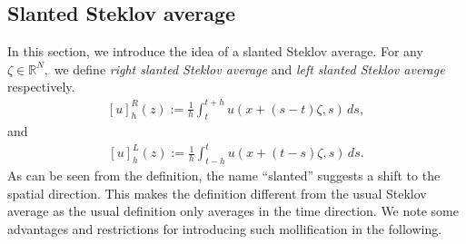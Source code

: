 \documentclass[10pt,a4paper]{amsart}
\numberwithin{equation}{section}
\newcommand{\RR}{\mathds{R}}
\begin{document}
\subsection{Slanted Steklov average}\label{subsec:slanting}
In this section, we introduce the idea of a slanted Steklov average. For any $\zeta \in \RR^N,$ we define \textit{right slanted Steklov average} and \textit{left slanted Steklov average} respectively. 
\begin{align}\label{right slanted steklov}
[u]_{h}^{R}(z):=\frac{1}{h}\int_{t}^{t+h}u(x+(s-t)\zeta,s)\, ds,
\end{align}
and 
\begin{align}\label{left slanted steklov}
 [u]_{h}^{L}(z):=\frac{1}{h}\int_{t-h}^{t}u(x+(t-s)\zeta,s)\, ds.
\end{align}
As can be seen from the definition, the name ``slanted'' suggests a shift to the spatial direction. This makes the definition different from the usual Steklov average as the usual definition only averages in the time direction. We note some advantages and restrictions for introducing such mollification in the following.
\end{document}
